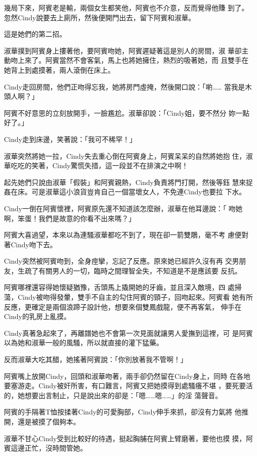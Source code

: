 幾局下來，阿賓老是輸，兩個女生都笑他，阿賓也不介意，反而覺得他賺
到了。忽然Cindy說要去上廁所，然後便開門出去，留下阿賓和淑華。

這是她們的第二招。

淑華撲到阿賓身上摟著他，要阿賓吻她，阿賓遲疑著這是別人的房間，淑
華卻主動吻上來了。阿賓當然不會客氣，馬上也將她擁住，熱烈的吸著她，而
且雙手在她背上到處摸著，兩人滾倒在床上。

Cindy走回房間，他們正吻得忘我，她將房門虛掩，然後開口說：「喲……
當我是木頭人啊？」

阿賓不好意思的立刻放開手，一臉尷尬。淑華卻說：「Cindy姐，要不然分
妳一點好了。」

Cindy走到床邊，笑著說：「我可不稀罕！」

淑華突然將她一拉，Cindy失去重心倒在阿賓身上，阿賓呆呆的自然將她抱
住，淑華吃吃的笑著，Cindy驚慌失措，這一段並不在排演之中啊！

起先她們只說由淑華「假裝」和阿賓親熱，Cindy負責將門打開，然後等鈺
慧來捉姦在床。可是淑華這小浪貨豈肯自己一個當壞女人，不免連Cindy也要拉
下水。

Cindy一倒在阿賓懷裡，阿賓原先還不知道該怎麼辦，淑華在他耳邊說：「
吻她啊，笨蛋！我們是故意的你看不出來嗎？」

阿賓大喜過望，本來以為連騷淑華都吃不到了，現在卻一箭雙鵰，毫不考
慮便對著Cindy吻下去。

Cindy突然被阿賓吻到，全身痙攣，忘記了反應。原來她已經許久沒有再
交男朋友，生疏了有關男人的一切，臨時之間理智全失，不知道是不是應該要
反抗。

阿賓哪裡還容得她懷疑猶豫，舌頭馬上撬開她的牙齒，並且深入敵境，四
處掃蕩，Cindy被吻得發暈，雙手不自主的勾住阿賓的頸子，回吻起來。阿賓看
她有所反應，更確定是兩個浪蹄子設計他，想要來個雙鳳戲龍，便不再客氣，
伸手在Cindy的乳房上亂摸。

Cindy真著急起來了，再離譜她也不會第一次見面就讓男人愛撫到這裡，可
是阿賓以為她和淑華一般的風騷，所以就直接的灌下猛藥。

反而淑華大吃其醋，她搖著阿賓說：「你別放著我不管啊！」

阿賓嘴上放開Cindy，回頭和淑華吻著，兩手卻仍然留在Cindy身上，同時
在各地要塞游走。Cindy被奸所害，有口難言，阿賓又把她摸得到處騷癢不堪
，要死要活的，她想要出言制止，只是說出來的卻是：「嗯……嗯……」的淫
蕩聲音。

阿賓的手隔著T恤按揉著Cindy的可愛胸部，Cindy伸手來抓，卻沒有力氣將
他推開，還是被摸了個夠本。

淑華不甘心Cindy受到比較好的待遇，挺起胸脯在阿賓上臂磨著，要他也摸
摸，阿賓這邊正忙，沒時間管她。

